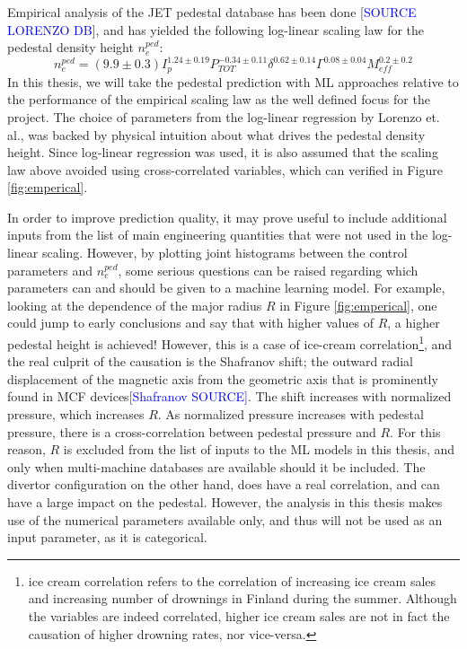 \documentclass[a4paper, twoside, final, 12pt]{article}
\begin{document}
Empirical analysis of the JET pedestal database has been done [\textcolor{blue}{SOURCE LORENZO DB}], and has yielded the following log-linear scaling law for the pedestal density height $n_e^{ped}$:
\begin{equation} \label{eq:scaling}
	n_e^{ped} = (9.9 \pm 0.3) I_p^{1.24 \pm 0.19} P_{TOT}^{-0.34 \pm 0.11} \delta^{0.62 \pm 0.14} \Gamma^{ 0.08 \pm 0.04} M_{eff}^{0.2 \pm 0.2}
\end{equation}
In this thesis, we will take the pedestal prediction with ML approaches relative to the performance of the empirical scaling law as the well defined focus for the project.
The choice of parameters from the log-linear regression by Lorenzo et. al., was backed by physical intuition about what drives the pedestal density height. Since log-linear regression was used, it is also assumed that the scaling law above avoided using cross-correlated variables, which can verified in Figure \ref{fig:emperical}. 

In order to improve prediction quality, it may prove useful to include additional inputs from the list of main engineering quantities that were not used in the log-linear scaling.
However, by plotting joint histograms between the control parameters and $n_e^{ped}$, some serious questions can be raised regarding which parameters can and should be given to a machine learning model.
For example, looking at the dependence of the major radius $R$ in Figure  \ref{fig:emperical}, one could jump to early conclusions and say that with higher values of $R$, a higher pedestal height is achieved!
However, this is a case of ice-cream correlation\footnote{ice cream correlation refers to the correlation of increasing ice cream sales and increasing number of drownings in Finland during the summer. Although the variables are indeed correlated, higher ice cream sales are not in fact the causation of higher drowning rates, nor vice-versa.}, and the real culprit of the causation is the Shafranov shift; the outward radial displacement of the magnetic axis from the geometric axis that is prominently found in MCF devices\textcolor{blue}{[Shafranov SOURCE]}. The shift increases with normalized pressure, which increases $R$. As normalized pressure increases with pedestal pressure, there is a cross-correlation between pedestal pressure and $R$. For this reason, $R$ is excluded from the list of inputs to the ML models in this thesis, and only when multi-machine databases are available should it be included.
The divertor configuration on the other hand, does have a real correlation, and can have a large impact on the pedestal. However, the analysis in this thesis makes use of the numerical parameters available only, and thus will not be used as an input parameter, as it is categorical.  
\end{document}
